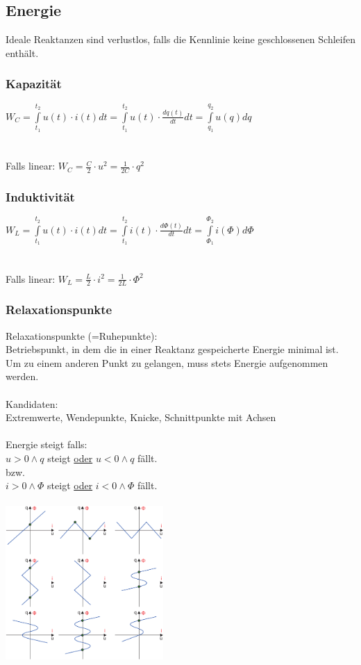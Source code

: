\documentclass[a4paper,twocolumn,10pt]{article}
\begin{document}
\subsection*{Energie}
Ideale Reaktanzen sind verlustlos, falls die Kennlinie keine geschlossenen Schleifen enthält.

\subsubsection*{Kapazität}
$W_C=\int\limits_{t_1}^{t_2}u(t)\cdot i(t)dt= \int\limits_{t_1}^{t_2}u(t)\cdot \frac{dq(t)}{dt}dt = \int\limits_{q_1}^{q_2}u(q)dq$\\\\\\
Falls linear: $W_C=\frac{C}{2}\cdot u^2=\frac{1}{2C}\cdot q^2$

\subsubsection*{Induktivität}
$W_L=\int\limits_{t_1}^{t_2}u(t)\cdot i(t)dt= \int\limits_{t_1}^{t_2}i(t)\cdot \frac{d\Phi(t)}{dt}dt = \int\limits_{\Phi_1}^{\Phi_2}i(\Phi)d\Phi$\\\\\\
Falls linear: $W_L=\frac{L}{2}\cdot i^2=\frac{1}{2L}\cdot \Phi^2$

\subsubsection*{Relaxationspunkte}
Relaxationspunkte (=Ruhepunkte):\\
Betriebspunkt, in dem die in einer Reaktanz gespeicherte Energie minimal ist.\\
Um zu einem anderen Punkt zu gelangen, muss stets Energie aufgenommen werden.\\\\
Kandidaten:\\
Extremwerte, Wendepunkte, Knicke, Schnittpunkte mit Achsen\\\\
Energie steigt falls:\\
$u>0 \land q$ steigt \underline{oder} $u<0 \land q$ fällt.\\
bzw.\\
$i>0 \land \Phi$ steigt \underline{oder} $i<0 \land \Phi$ fällt.\\\\
\includegraphics[width=0.45\textwidth]{Grafiken/Relaxationspunkte}
\end{document}
